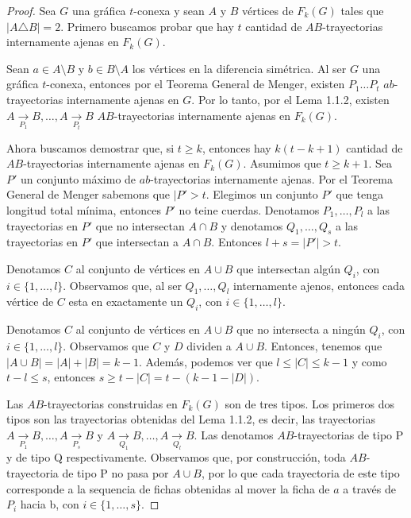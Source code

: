 \begin{proof}
    Sea $G$ una gr\'afica $t$-conexa y sean $A$ y $B$ v\'ertices de
    $F_{k}(G)$ tales que $|A \triangle B| = 2$. Primero buscamos probar que
    hay $t$ cantidad de $AB$-trayectorias internamente ajenas en
    $F_{k}(G)$. 
    
    Sean $a \in A \setminus B$ y $b \in B \setminus A$ los
    v\'ertices en la diferencia sim\'etrica. Al ser $G$ una gr\'afica
    $t$-conexa, entonces por el Teorema General de Menger, existen
    $P_{1} \dots P_{t}$ $ab$-trayectorias internamente ajenas en
    $G$. Por lo tanto, por el Lema 1.1.2, existen $A \xrightarrow[P_1]{}  B,
    \dots, A \xrightarrow[P_t]{}  B$ $AB$-trayectorias internamente
    ajenas en $F_{k}(G)$. 

    Ahora buscamos demostrar que, si $t \geq k$, entonces hay $k(t- k +1)$
    cantidad de $AB$-trayectorias internamente ajenas en
    $F_{k}(G)$. Asumimos que $t \geq k + 1$. Sea $P'$ un conjunto m\'aximo
    de $ab$-trayectorias internamente ajenas. Por el Teorema
    General de Menger sabemons que $|P'>t$. Elegimos un conjunto $P'$ que
    tenga longitud total m\'inima, entonces $P'$ no teine cuerdas.
    Denotamos $P_{1}, \dots, P_{l}$ a las trayectorias en $P'$ que no
    intersectan $A \cap B$ y denotamos $Q_{1}, \dots, Q_{s}$ a las
    trayectorias en $P'$ que intersectan a $A \cap B$. Entonces $l + s =
    |P'| > t$.

    Denotamos $C$ al conjunto de v\'ertices en $A \cup B$ que intersectan
    alg\'un $Q_i$, con $i \in \{1, \dots, l\}$. Observamos que, al ser $Q_1,
    \dots, Q_l$ internamente ajenos, entonces cada v\'ertice de $C$ esta en
    exactamente un $Q_i$, con $i \in \{1, \dots, l\}$. 

    Denotamos $C$ al conjunto de v\'ertices en $A \cup B$ que no intersecta a
    ning\'un $Q_i$, con $i \in \{1, \dots, l\}$. Observamos que $C$ y $D$
    dividen a $A \cup B$. Entonces, tenemos que $|A\cup B| = |A| + |B| = k-1$.
    Adem\'as, podemos ver que $l \leq |C| \leq k-1$ y como $ t - l \leq s$,
    entonces $s \geq t -|C| = t- (k-1-|D|)$.

    Las $AB$-trayectorias construidas en $F_{k}(G)$ son de tres tipos. Los
    primeros dos tipos son las trayectorias obtenidas del Lema 1.1.2, es decir,
    las trayectorias $A \xrightarrow[P_1]{}  B, \dots, A \xrightarrow[P_s]{}  B$
    y $A \xrightarrow[Q_1]{}  B, \dots, A \xrightarrow[Q_l]{}  B$. Las denotamos
    $AB$-trayectorias de tipo P y de tipo Q respectivamente. Observamos que, por
    construcci\'on, toda $AB$-trayectoria de tipo P no pasa por $A\cup B$, por
    lo que cada trayectoria de este tipo corresponde a la sequencia de fichas
    obtenidas al mover la ficha de $a$ a trav\'es de $P_i$ hacia b, con $i \in
    \{1, \dots, s\}$.

\end{proof}

